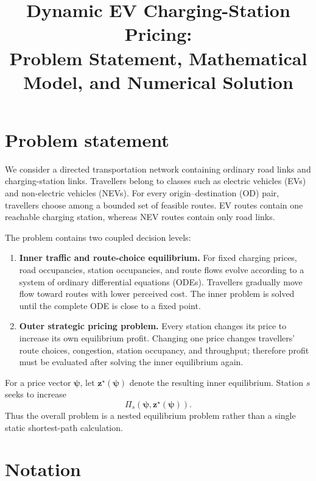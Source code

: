\documentclass[11pt]{article}
\title{Dynamic EV Charging-Station Pricing:\\Problem Statement, Mathematical Model, and Numerical Solution}
\author{}
\date{}
\begin{document}
\maketitle

\section{Problem statement}

We consider a directed transportation network containing ordinary road links
and charging-station links. Travellers belong to classes such as electric
vehicles (EVs) and non-electric vehicles (NEVs). For every origin--destination
(OD) pair, travellers choose among a bounded set of feasible routes. EV routes
contain one reachable charging station, whereas NEV routes contain only road
links.

The problem contains two coupled decision levels:

\begin{enumerate}
    \item \textbf{Inner traffic and route-choice equilibrium.} For fixed
    charging prices, road occupancies, station occupancies, and route flows
    evolve according to a system of ordinary differential equations (ODEs).
    Travellers gradually move flow toward routes with lower perceived cost.
    The inner problem is solved until the complete ODE is close to a fixed
    point.

    \item \textbf{Outer strategic pricing problem.} Every station changes its
    price to increase its own equilibrium profit. Changing one price changes
    travellers' route choices, congestion, station occupancy, and throughput;
    therefore profit must be evaluated after solving the inner equilibrium
    again.
\end{enumerate}

For a price vector $\boldsymbol{\psi}$, let
$\mathbf{z}^{\star}(\boldsymbol{\psi})$ denote the resulting inner
equilibrium. Station $s$ seeks to increase
\begin{equation}
    \Pi_s\!\left(\boldsymbol{\psi},
    \mathbf{z}^{\star}(\boldsymbol{\psi})\right).
\end{equation}
Thus the overall problem is a nested equilibrium problem rather than a single
static shortest-path calculation.

\section{Notation}
\end{document}
